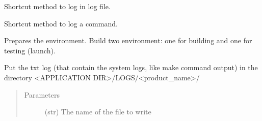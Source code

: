 \documentclass[a4paper,10pt,english]{sphinxmanual}
\begin{document}
\begin{fulllineitems}

\begin{fulllineitems}
\label{\detokenize{apidoc_src/src:src.compilation.Builder.log}}
Shortcut method to log in log file.

\end{fulllineitems}


\begin{fulllineitems}
\label{\detokenize{apidoc_src/src:src.compilation.Builder.log_command}}
Shortcut method to log a command.

\end{fulllineitems}


\begin{fulllineitems}
\label{\detokenize{apidoc_src/src:src.compilation.Builder.make}}
\end{fulllineitems}


\begin{fulllineitems}
\label{\detokenize{apidoc_src/src:src.compilation.Builder.prepare}}
Prepares the environment.
Build two environment: one for building and one for testing (launch).

\end{fulllineitems}


\begin{fulllineitems}
\label{\detokenize{apidoc_src/src:src.compilation.Builder.put_txt_log_in_appli_log_dir}}
Put the txt log (that contain the system logs, like make command output)
in the directory \textless{}APPLICATION DIR\textgreater{}/LOGS/\textless{}product\_name\textgreater{}/
\begin{quote}\begin{description}
\item[{Parameters}] \leavevmode
{} \textendash{} (str) The name of the file to write


\end{description}
\end{quote}
\end{fulllineitems}
\end{fulllineitems}
\end{document}
